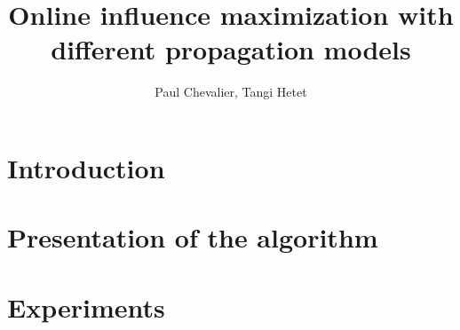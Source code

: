 \documentclass[a4paper,10pt]{article}
\title{Online influence maximization with different propagation models}
\author{Paul Chevalier, Tangi Hetet}
\begin{document}
\maketitle

\begin{abstract}

\end{abstract}

\section{Introduction}

\section{Presentation of the algorithm}

\section{Experiments}
\end{document}
